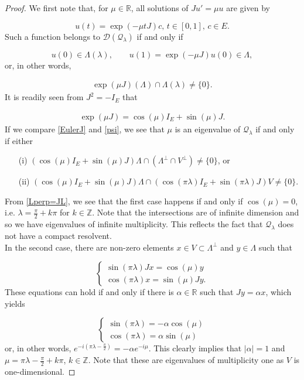 \documentclass[a4paper,10pt]{article}
\begin{document}
\begin{proof} 
We first note that, for $\mu\in\mathbb{R}$, all solutions of $Ju'=\mu u$ are given by

\[u(t)=\exp(-\mu tJ)c,\, t\in[0,1],\,c\in E.\]
Such a function belongs to $\mathcal{D}(\mathcal{Q}_\lambda)$ if and only if

\[u(0)\in\Lambda(\lambda),\qquad u(1)=\exp(-\mu J)u(0)\in\Lambda,\]
or, in other words,

\begin{align*}
\exp(\mu J)(\Lambda)\cap\Lambda(\lambda)\neq\{0\}.
\end{align*}
It is readily seen from $J^2=-I_E$ that

\begin{align}\label{EulerJ}
\exp(\mu J)=\cos(\mu)I_E+\sin(\mu)J.
\end{align}
If we compare \eqref{EulerJ} and \eqref{psi}, we see that $\mu$ is an eigenvalue of $\mathcal{Q}_\lambda$ if and only if either

\begin{itemize}
\item[(i)] $(\cos(\mu)I_E+\sin(\mu)J)\Lambda\cap(\Lambda^\perp\cap V^\perp)\neq\{0\}$, or
\item[(ii)] $(\cos(\mu)I_E+\sin(\mu)J)\Lambda\cap (\cos(\pi \lambda)I_E+\sin(\pi \lambda)J)V\neq\{0\}$.
\end{itemize}
From \eqref{Lperp=JL}, we see that the first case happens if and only if $\cos(\mu)=0$, i.e. $\lambda=\frac{\pi}{2}+k\pi$ for $k\in\mathbb{Z}$. Note that the intersections are of infinite dimension and so we have eigenvalues of infinite multiplicity. This reflects the fact that $\mathcal{Q}_\lambda$ does not have a compact resolvent.\\
In the second case, there are non-zero elements $x\in V\subset\Lambda^\perp$ and $y\in\Lambda$ such that

\[\begin{cases}
\sin(\pi \lambda)Jx=\cos(\mu)y\\
\cos(\pi \lambda)x=\sin(\mu)Jy.
\end{cases}\]
These equations can hold if and only if there is $\alpha\in\mathbb{R}$ such that $Jy=\alpha x$, which yields

\[\begin{cases}
\sin(\pi \lambda)=-\alpha\cos(\mu)\\
\cos(\pi \lambda)=\alpha\sin(\mu)
\end{cases}\]
or, in other words, $e^{-i(\pi \lambda-\frac{\pi}{2})}=-\alpha e^{-i\mu}$. This clearly implies that $|\alpha|=1$ and $\mu=\pi \lambda-\frac{\pi}{2}+k\pi$, $k\in\mathbb{Z}$. Note that these are eigenvalues of multiplicity one as $V$ is one-dimensional. 
\end{proof}
\end{document}
